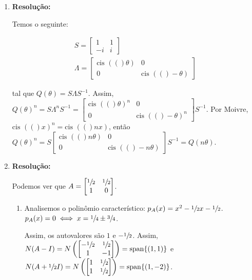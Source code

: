 \documentclass[leqno]{article}
\DeclareMathOperator{\spn}{span}
\newcommand{\cis}[1]{\text{cis }(#1)}
\begin{document}
\begin{enumerate}
    \item 
    
    \textbf{Resolução:}
    
    Temos o seguinte:
    
    \begin{align*}
        S=\begin{bmatrix}1 & 1\\
        -i & i\end{bmatrix}\\
        \Lambda=\begin{bmatrix}\cis(\theta) & 0\\
        0 & \cis(-\theta)\end{bmatrix}
    \end{align*}
    
    tal que $Q(\theta)=S\Lambda S^{-1}$. Assim, $Q(\theta)^n=S\Lambda^nS^{-1}=\begin{bmatrix}\cis(\theta)^n & 0\\
    0 & \cis(-\theta)^n
    \end{bmatrix}S^{-1}$. Por Moivre, $\cis(x)^n=\cis(nx)$, então $Q(\theta)^n=S\begin{bmatrix}\cis(n\theta) & 0\\
    0 & \cis(-n\theta)\end{bmatrix}S^{-1}=Q(n\theta)$.
    
    \item 
    
    \textbf{Resolução:}
    
    Podemos ver que $A=\begin{bmatrix}\sfrac{1}{2} & \sfrac{1}{2}\\
    1 & 0\end{bmatrix}$.
    
    \begin{enumerate}
        \item Analisemos o polinômio característico: $p_A(x)=x^2-\sfrac{1}{2}x-\sfrac{1}{2}$. $p_A(x)=0\iff x=\sfrac{1}{4}\pm \sfrac{3}{4}$.
        
        Assim, os autovalores são $1$ e $-\sfrac{1}{2}$. Assim, $N(A-I)=N\left(\begin{bmatrix}-\sfrac{1}{2} & \sfrac{1}{2}\\1 & -1\end{bmatrix}\right)=\spn\{(1,1)\}$ e $N(A+\sfrac{1}{2}I)=N\left(\begin{bmatrix}1 & \sfrac{1}{2}\\
        1 & \sfrac{1}{2}\end{bmatrix}\right)=\spn\{(1,-2)\}$.
        

\end{enumerate}
\end{enumerate}
\end{document}
